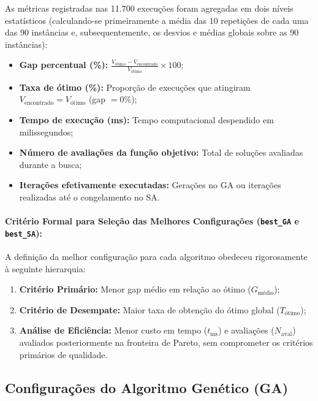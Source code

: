 \documentclass[12pt]{article}
\begin{document}
As métricas registradas nas 11.700 execuções foram agregadas em dois níveis estatísticos (calculando-se primeiramente a média das 10 repetições de cada uma das 90 instâncias e, subsequentemente, os desvios e médias globais sobre as 90 instâncias):
\begin{itemize}
    \item \textbf{Gap percentual (\%):} $\frac{V_{\text{ótimo}} - V_{\text{encontrado}}}{V_{\text{ótimo}}} \times 100$;
    \item \textbf{Taxa de ótimo (\%):} Proporção de execuções que atingiram $V_{\text{encontrado}} = V_{\text{ótimo}}$ (gap $= 0\%$);
    \item \textbf{Tempo de execução (ms):} Tempo computacional despendido em milissegundos;
    \item \textbf{Número de avaliações da função objetivo:} Total de soluções avaliadas durante a busca;
    \item \textbf{Iterações efetivamente executadas:} Gerações no GA ou iterações realizadas até o congelamento no SA.
\end{itemize}

\paragraph{Critério Formal para Seleção das Melhores Configurações (\texttt{best\_GA} e \texttt{best\_SA}):}
A definição da melhor configuração para cada algoritmo obedeceu rigorosamente à seguinte hierarquia:
\begin{enumerate}
    \item \textbf{Critério Primário:} Menor gap médio em relação ao ótimo ($G_{\text{médio}}$);
    \item \textbf{Critério de Desempate:} Maior taxa de obtenção do ótimo global ($T_{\text{ótimo}}$);
    \item \textbf{Análise de Eficiência:} Menor custo em tempo ($t_{\text{ms}}$) e avaliações ($N_{\text{aval}}$) avaliados posteriormente na fronteira de Pareto, sem comprometer os critérios primários de qualidade.
\end{enumerate}

\subsection{Configurações do Algoritmo Genético (GA)}
\end{document}
